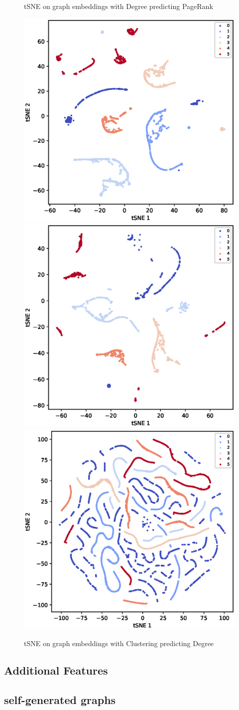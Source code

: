 \documentclass[sigconf]{acmart}
\begin{document}
\begin{figure}[h]
\begin{center}
      \caption{tSNE on graph embeddings with Degree predicting PageRank}
    \hspace*{-1.5in}
      \includegraphics[width=0.35\linewidth]{fig/Cora_2to1_tSNE.eps}
      \includegraphics[width=0.35\linewidth]{fig/Citeseer_2to1_tSNE.eps}
      \includegraphics[width=0.35\linewidth]{fig/PubMed_2to1_tSNE.eps}
      \hspace*{-1.5in}

      \caption{tSNE on graph embeddings with Clustering predicting Degree}
  \end{center}
  \end{figure}









\subsection{Additional Features}



\subsection{self-generated graphs}
\end{document}
